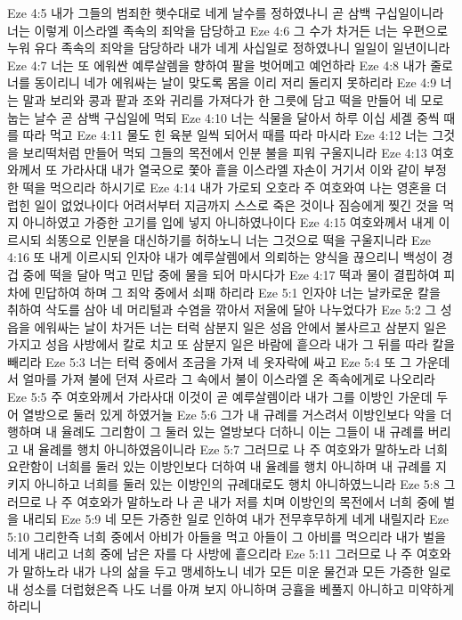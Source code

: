 Eze 4:5  내가 그들의 범죄한 햇수대로 네게 날수를 정하였나니 곧 삼백 구십일이니라 너는 이렇게 이스라엘 족속의 죄악을 담당하고
Eze 4:6  그 수가 차거든 너는 우편으로 누워 유다 족속의 죄악을 담당하라 내가 네게 사십일로 정하였나니 일일이 일년이니라
Eze 4:7  너는 또 에워싼 예루살렘을 향하여 팔을 벗어메고 예언하라
Eze 4:8  내가 줄로 너를 동이리니 네가 에워싸는 날이 맞도록 몸을 이리 저리 돌리지 못하리라
Eze 4:9  너는 말과 보리와 콩과 팥과 조와 귀리를 가져다가 한 그릇에 담고 떡을 만들어 네 모로 눕는 날수 곧 삼백 구십일에 먹되
Eze 4:10  너는 식물을 달아서 하루 이십 세겔 중씩 때를 따라 먹고
Eze 4:11  물도 힌 육분 일씩 되어서 때를 따라 마시라
Eze 4:12  너는 그것을 보리떡처럼 만들어 먹되 그들의 목전에서 인분 불을 피워 구울지니라
Eze 4:13  여호와께서 또 가라사대 내가 열국으로 쫓아 흩을 이스라엘 자손이 거기서 이와 같이 부정한 떡을 먹으리라 하시기로
Eze 4:14  내가 가로되 오호라 주 여호와여 나는 영혼을 더럽힌 일이 없었나이다 어려서부터 지금까지 스스로 죽은 것이나 짐승에게 찢긴 것을 먹지 아니하였고 가증한 고기를 입에 넣지 아니하였나이다
Eze 4:15  여호와께서 내게 이르시되 쇠똥으로 인분을 대신하기를 허하노니 너는 그것으로 떡을 구울지니라
Eze 4:16  또 내게 이르시되 인자야 내가 예루살렘에서 의뢰하는 양식을 끊으리니 백성이 경겁 중에 떡을 달아 먹고 민답 중에 물을 되어 마시다가
Eze 4:17  떡과 물이 결핍하여 피차에 민답하여 하며 그 죄악 중에서 쇠패 하리라
Eze 5:1  인자야 너는 날카로운 칼을 취하여 삭도를 삼아 네 머리털과 수염을 깎아서 저울에 달아 나누었다가
Eze 5:2  그 성읍을 에워싸는 날이 차거든 너는 터럭 삼분지 일은 성읍 안에서 불사르고 삼분지 일은 가지고 성읍 사방에서 칼로 치고 또 삼분지 일은 바람에 흩으라 내가 그 뒤를 따라 칼을 빼리라
Eze 5:3  너는 터럭 중에서 조금을 가져 네 옷자락에 싸고
Eze 5:4  또 그 가운데서 얼마를 가져 불에 던져 사르라 그 속에서 불이 이스라엘 온 족속에게로 나오리라
Eze 5:5  주 여호와께서 가라사대 이것이 곧 예루살렘이라 내가 그를 이방인 가운데 두어 열방으로 둘러 있게 하였거늘
Eze 5:6  그가 내 규례를 거스려서 이방인보다 악을 더 행하며 내 율례도 그리함이 그 둘러 있는 열방보다 더하니 이는 그들이 내 규례를 버리고 내 율례를 행치 아니하였음이니라
Eze 5:7  그러므로 나 주 여호와가 말하노라 너희 요란함이 너희를 둘러 있는 이방인보다 더하여 내 율례를 행치 아니하며 내 규례를 지키지 아니하고 너희를 둘러 있는 이방인의 규례대로도 행치 아니하였느니라
Eze 5:8  그러므로 나 주 여호와가 말하노라 나 곧 내가 저를 치며 이방인의 목전에서 너희 중에 벌을 내리되
Eze 5:9  네 모든 가증한 일로 인하여 내가 전무후무하게 네게 내릴지라
Eze 5:10  그리한즉 너희 중에서 아비가 아들을 먹고 아들이 그 아비를 먹으리라 내가 벌을 네게 내리고 너희 중에 남은 자를 다 사방에 흩으리라
Eze 5:11  그러므로 나 주 여호와가 말하노라 내가 나의 삶을 두고 맹세하노니 네가 모든 미운 물건과 모든 가증한 일로 내 성소를 더럽혔은즉 나도 너를 아껴 보지 아니하며 긍휼을 베풀지 아니하고 미약하게 하리니
